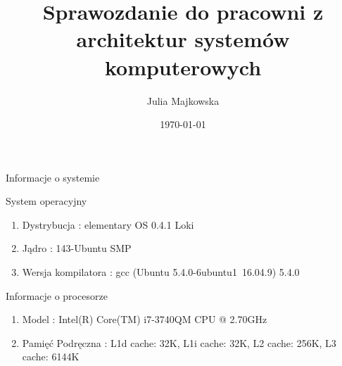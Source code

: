 \documentclass[11pt,wide]{mwart}
\author{Julia Majkowska}
\title{Sprawozdanie do pracowni z architektur systemów komputerowych}
\date{\today}
\begin{document}
\maketitle

\begin{section}{Informacje o systemie}
\begin{subsection}{System operacyjny}

\begin{enumerate}
\item{Dystrybucja}  : elementary OS 0.4.1 Loki
\item{Jądro} : 143-Ubuntu SMP
\item{Wersja kompilatora} : gcc (Ubuntu 5.4.0-6ubuntu1~16.04.9) 5.4.0 


\end{enumerate}
\end{subsection}{Informacje o procesorze}
\begin{enumerate}
\item{Model}  :  Intel(R) Core(TM) i7-3740QM CPU @ 2.70GHz
\item{Pamięć Podręczna} : L1d cache:             32K,
L1i cache:             32K,
L2 cache:              256K,
L3 cache:              6144K




\end{enumerate}


\end{section}
\end{document}
